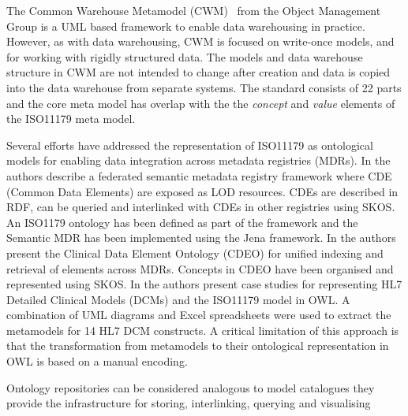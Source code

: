 The Common Warehouse Metamodel (CWM)~\cite{poole03} from the Object Management Group is a UML based framework to enable data warehousing in practice. However, as with data warehousing, CWM is focused on write-once models, and for working with rigidly structured data. The models and data warehouse structure in CWM are not intended to change after creation and data is copied into the data warehouse from separate systems. The standard consists of 22 parts and the core meta model has overlap with the the \emph{concept} and \emph{value} elements of the ISO11179 meta model.





Several efforts have addressed the representation of ISO11179 as
ontological models for enabling data integration across metadata
registries (MDRs). In \cite{Sinaci2013784} the authors describe a
federated semantic metadata registry framework where CDE (Common Data
Elements) are exposed as LOD resources. CDEs are described in RDF, can
be queried and interlinked with CDEs in other registries using
SKOS. An ISO1179 ontology has been defined as part of the framework
and the Semantic MDR has been implemented using the Jena framework. In
\cite{pmid25405066} the authors present the Clinical Data Element
Ontology (CDEO) for unified indexing and retrieval of elements across
MDRs. Concepts in CDEO have been organised and represented using
SKOS. In \cite{pmid22211181} the authors present case studies for
representing HL7 Detailed Clinical Models (DCMs) and the ISO11179
model in OWL. A combination of UML diagrams and Excel spreadsheets
were used to extract the metamodels for 14 HL7 DCM constructs. A
critical limitation of this approach is that the transformation from
metamodels to their ontological representation in OWL is based on a
manual encoding.


Ontology repositories can be considered analogous to model catalogues
 they provide the infrastructure for storing, interlinking, querying and visualising 
